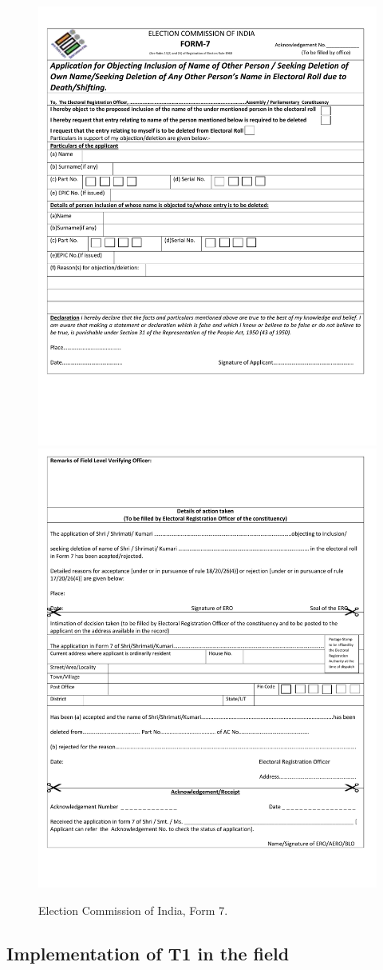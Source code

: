 \documentclass[
  11.5pt,
]{article}
\begin{document}
\begin{figure}
\includegraphics[width=0.5\linewidth]{pic-form-7-p1} \includegraphics[width=0.5\linewidth]{pic-form-7-p2} \caption{Election Commission of India, Form 7.}\label{fig:unnamed-chunk-28}
\end{figure}

\subsection{Implementation of T1 in the field}
\end{document}
